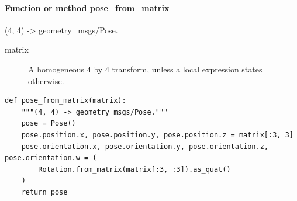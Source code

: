 \documentclass[11pt,a4paper]{book}
\begin{document}
\paragraph{Function or method pose\_from\_matrix}
(4, 4) -> geometry\_msgs/Pose.

\begin{description}
\item[matrix] A homogeneous 4 by 4 transform, unless a local expression states otherwise.
\end{description}

\begin{lstlisting}[firstnumber=19]
def pose_from_matrix(matrix):
    """(4, 4) -> geometry_msgs/Pose."""
    pose = Pose()
    pose.position.x, pose.position.y, pose.position.z = matrix[:3, 3]
    pose.orientation.x, pose.orientation.y, pose.orientation.z, pose.orientation.w = (
        Rotation.from_matrix(matrix[:3, :3]).as_quat()
    )
    return pose


\end{lstlisting}
\end{document}
